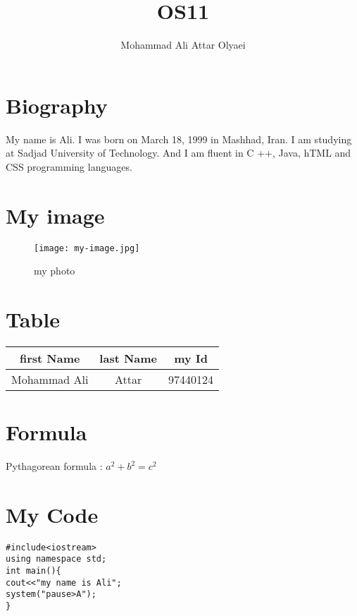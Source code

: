 \documentclass{article}
\title{OS11}
\author{Mohammad Ali Attar Olyaei}
\begin{document}
\maketitle

\section{Biography}
My name is Ali.  I was born on March 18, 1999 in Mashhad, Iran. I am studying at Sadjad University of Technology.  And I am fluent in C ++, Java, hTML and CSS programming languages.
 
 
 \section{My image}
\begin{figure}[h!]
\centering
\texttt{[image: my-image.jpg]}
\caption{my photo}
\end{figure} 

\section{Table}
\begin{table}[h]

\begin{tabular}{ |c|c|c| }

\hline
first Name & last Name & my Id\\
\hline
Mohammad Ali & Attar & 97440124\\


\end{tabular}
\end{table}


\section{Formula}

Pythagorean formula : $a^2+b^2=c^2$


\section{My Code}
\lstset{language=C++}
\begin{lstlisting}
#include<iostream>
using namespace std;
int main(){
cout<<"my name is Ali";
system("pause>A");
}
\end{lstlisting}
\end{document}
